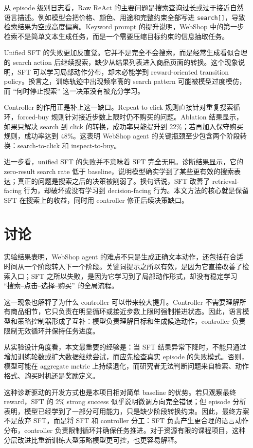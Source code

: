 \documentclass[11pt]{article}
\begin{document}
从 episode 级别日志看，Raw ReAct 的主要问题是搜索查询过长或过于接近自然语言描述。例如模型会把价格、颜色、用途和完整约束全部写进 \texttt{search[]}，导致检索结果为空或高度偏离。Keyword prompt 的提升说明，WebShop 中的第一步检索不是简单文本生成任务，而是一个需要压缩目标约束的信息抽取任务。

Unified SFT 的失败更加反直觉。它并不是完全不会搜索，而是经常生成看似合理的 search action 后继续搜索，缺少从结果列表进入商品页面的转换。这个现象说明，SFT 可以学习局部动作分布，却未必能学到 reward-oriented transition policy。换言之，训练轨迹中出现频率高的 search pattern 可能被模型过度模仿，而 ``何时停止搜索'' 这一决策没有被充分学习。

Controller 的作用正是补上这一缺口。Repeat-to-click 规则直接针对重复搜索循环，forced-buy 规则针对接近步数上限时仍不购买的问题。Ablation 结果显示，如果只解决 search 到 click 的转换，成功率只能提升到 22\%；若再加入保守购买规则，成功率达到 48\%。这表明 WebShop agent 的关键瓶颈至少包含两个阶段转换：search-to-click 和 inspect-to-buy。

进一步看，unified SFT 的失败并不意味着 SFT 完全无用。诊断结果显示，它的 zero-result search rate 低于 baseline，说明模型确实学到了某些更有效的搜索表达；真正的问题是搜索之后的决策被削弱了。换句话说，SFT 改善了 retrieval-facing 行为，却破坏或没有学习到 decision-facing 行为。本文方法的核心就是保留 SFT 在搜索上的收益，同时用 controller 修正后续决策缺口。

\section{讨论}

实验结果表明，WebShop agent 的难点不只是生成正确文本动作，还包括在合适时间从一个阶段转入下一个阶段。关键词提示之所以有效，是因为它直接改善了检索入口；SFT 之所以失败，是因为它学习到了局部动作形式，却没有稳定学习 ``搜索--点击--选择--购买'' 的全局流程。

这一现象也解释了为什么 controller 可以带来较大提升。Controller 不需要理解所有商品细节，它只负责在明显循环或接近步数上限时强制推进状态。因此，语言模型和策略控制器形成了互补：模型负责理解目标和生成候选动作，controller 负责限制无效循环并保持任务进度。

从实验设计角度看，本文最重要的经验是：当 SFT 结果异常下降时，不能只通过增加训练轮数或扩大数据继续尝试，而应先检查真实 episode 的失败模式。否则，模型可能在 aggregate metric 上持续退化，而研究者无法判断问题来自检索、动作格式、购买时机还是奖励定义。

这种诊断驱动的开发方式也是本项目相对简单 baseline 的优势。若只观察最终 reward，SFT 的 2\% strong success 似乎说明微调方向完全错误；但 episode 分析表明，模型已经学到了一部分可用能力，只是缺少阶段转换约束。因此，最终方案不是放弃 SFT，而是将 SFT 和 controller 分工：SFT 负责产生更合理的语言动作分布，controller 负责限制循环并确保任务推进。对于资源有限的课程项目，这种分层改进比重新训练大型策略模型更可控，也更容易解释。
\end{document}

